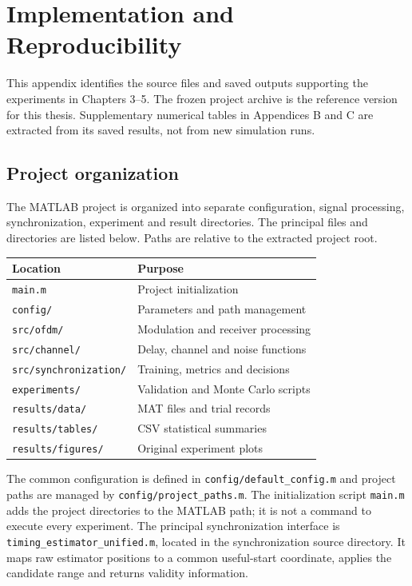 \appendix
\chapter[Implementation and Reproducibility]{Implementation and Reproducibility}
\label{app:reproducibility}

This appendix identifies the source files and saved outputs supporting the
experiments in Chapters 3--5. The frozen project archive is the reference
version for this thesis. Supplementary numerical tables in Appendices B and C
are extracted from its saved results, not from new simulation runs.

\section{Project organization}
The MATLAB project is organized into separate configuration, signal processing,
synchronization, experiment and result directories. The principal files and
directories are listed below. Paths are relative to the extracted project root.

\begin{center}
\begin{small}
\begin{tabular}{ll}
\hline
Location & Purpose \\
\hline
\texttt{main.m} & Project initialization \\
\texttt{config/} & Parameters and path management \\
\texttt{src/ofdm/} & Modulation and receiver processing \\
\texttt{src/channel/} & Delay, channel and noise functions \\
\texttt{src/synchronization/} & Training, metrics and decisions \\
\texttt{experiments/} & Validation and Monte Carlo scripts \\
\texttt{results/data/} & MAT files and trial records \\
\texttt{results/tables/} & CSV statistical summaries \\
\texttt{results/figures/} & Original experiment plots \\
\hline
\end{tabular}
\end{small}
\end{center}

The common configuration is defined in \verb|config/default_config.m| and
project paths are managed by \verb|config/project_paths.m|. The initialization
script \verb|main.m| adds the project directories to the MATLAB path; it is
not a command to execute every experiment. The principal synchronization
interface is \verb|timing_estimator_unified.m|, located in the synchronization
source directory. It maps raw estimator positions to a common useful-start
coordinate, applies the candidate range and returns validity information.

